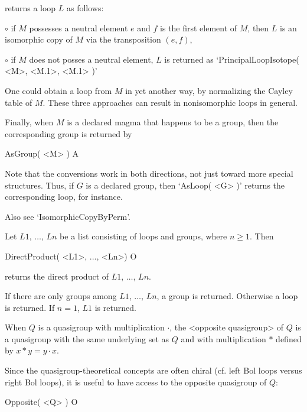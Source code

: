returns a loop $L$ as follows:
\beginlist%
\item{$\circ$}
    if $M$ possesses a neutral element $e$ and $f$ is the first element of $M$,
    then $L$ is an isomorphic copy of $M$ via the transposition $(e,f)$,
\item{$\circ$}
    if $M$ does not posses a neutral element, $L$ is returned as
    `PrincipalLoopIsotope( <M>, <M.1>, <M.1> )'
\endlist

One could obtain a loop from $M$ in yet another way, by normalizing the Cayley
table of $M$. These three approaches can result in nonisomorphic loops in
general.

Finally, when $M$ is a declared magma that happens to be a group, then the
corresponding group is returned by

\>AsGroup( <M> ) A

Note that the conversions work in both directions, not just toward more special
structures. Thus, if $G$ is a declared group, then `AsLoop( <G> )' returns the
corresponding loop, for instance.

Also see `IsomorphicCopyByPerm'.


\noindent Let $L1$, $\dots$, $Ln$ be a list consisting of loops and groups,
where $n\ge 1$. Then

\>DirectProduct( <L1>, ..., <Ln>) O

returns the direct product of $L1$, $\dots$, $Ln$.

If there are only groups among $L1$, $\dots$, $Ln$, a group is returned.
Otherwise a loop is returned. If $n=1$, $L1$ is returned.


When $Q$ is a quasigroup with multiplication $\cdot$, the <opposite quasigroup>
%
%
 of $Q$ is a quasigroup with the same underlying set as $Q$ and with
multiplication $*$ defined by $x*y=y\cdot x$.

Since the quasigroup-theoretical concepts are often chiral (cf. left Bol loops
versus right Bol loops), it is useful to have access to the opposite quasigroup
of $Q$:

\>Opposite( <Q> ) O
